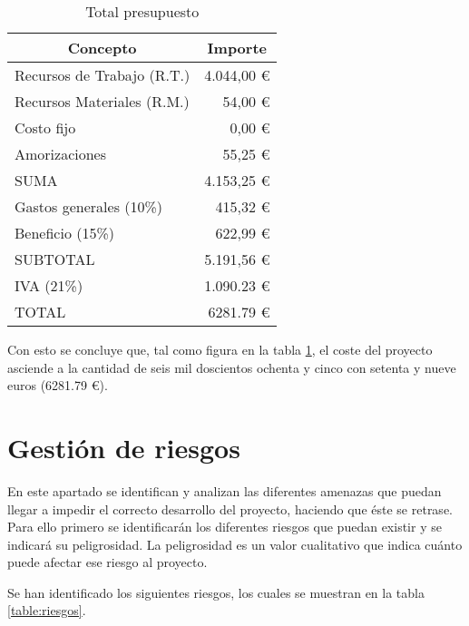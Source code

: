 \begin{table}[H]
	\centering
	\begin{tabular}{ |l|r| } 
		\hline
		\multicolumn{1}{|c|}{Concepto} & 
			\multicolumn{1}{|c|}{Importe} \\
		\hline
		Recursos de Trabajo (R.T.)	& 4.044,00 \euro	\\
		Recursos Materiales (R.M.)	& 54,00 \euro		\\
		Costo fijo					& 0,00 \euro		\\
		Amorizaciones				& 55,25 \euro		\\
		\hline
		SUMA						& 4.153,25 \euro	\\
		\hline
		Gastos generales (10\%)		& 415,32 \euro		\\
		Beneficio (15\%)			& 622,99 \euro		\\
		\hline
		SUBTOTAL					& 5.191,56 \euro	\\
		IVA (21\%)					& 1.090.23 \euro	\\
		\hline
		TOTAL						& 6281.79 \euro		\\
		\hline
	\end{tabular}
	\caption{Total presupuesto}
	\label{table:total-presupuesto}
\end{table}

Con esto se concluye que, tal como figura en la tabla \ref{table:total-presupuesto}, el coste del proyecto asciende a la cantidad de seis mil doscientos ochenta y cinco con setenta y nueve euros (6281.79 \euro).


\section{Gestión de riesgos}

En este apartado se identifican y analizan las diferentes amenazas que puedan llegar a impedir el correcto desarrollo del proyecto, haciendo que éste se retrase. Para ello primero se identificarán los diferentes riesgos que puedan existir y se indicará su peligrosidad. La peligrosidad es un valor cualitativo que indica cuánto puede afectar ese riesgo al proyecto.

Se han identificado los siguientes riesgos, los cuales se muestran en la tabla \ref{table:riesgos}.


